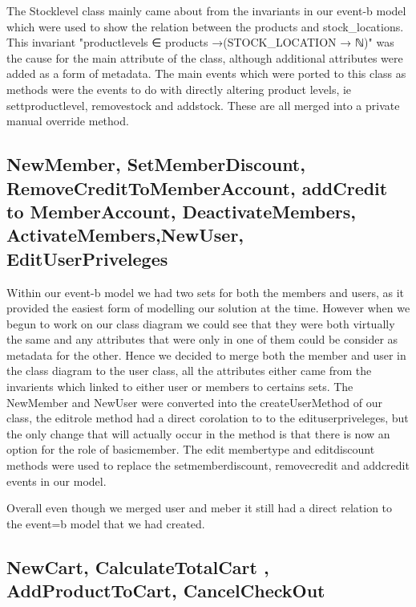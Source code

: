 \documentclass[a4paper]{article}
\begin{document}
The Stocklevel class mainly came about from the invariants in our event-b model which were used to show the relation between the products and stock_locations. This invariant "productlevels ∈ products →(STOCK_LOCATION → ℕ)"  was the cause for the main attribute of the class, although additional attributes were added as a form of metadata. The main events which were ported to this class as methods were the events to do with directly altering product levels, ie settproductlevel, removestock and addstock. These are all merged into a private manual override method.

\subsection{NewMember, SetMemberDiscount, RemoveCreditToMemberAccount, addCredit to MemberAccount, DeactivateMembers, ActivateMembers,NewUser, EditUserPriveleges}

Within our event-b model we had two sets for both the members and users, as it provided the easiest form of modelling our solution at the time. However when we begun to work on our class diagram we could see that they were both virtually the same and any attributes that were only in one of them could be consider as metadata for the other. Hence we decided to merge both the member and user in the class diagram to the user class, all the attributes either came from the invarients which linked to either user or members to certains sets. The NewMember and NewUser were converted into the createUserMethod of our class, the editrole method had a direct corolation to to the edituserpriveleges, but the only change that will actually occur in the method is that there is now an option for the role of basicmember. The edit membertype and editdiscount methods were used to replace the setmemberdiscount, removecredit and addcredit events in our model. 

Overall even though we merged user and meber it still had a direct relation to the event=b model that we had created. 


\subsection{NewCart, CalculateTotalCart , AddProductToCart, CancelCheckOut}
\end{document}
